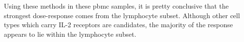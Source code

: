 Using these methods in these pbmc samples, it is pretty conclusive that the strongest dose-response comes from the lymphocyte subset.
Although other cell types which carry IL-2 receptors are candidates, the majority of the response appears to lie within the lymphocyte subset.









